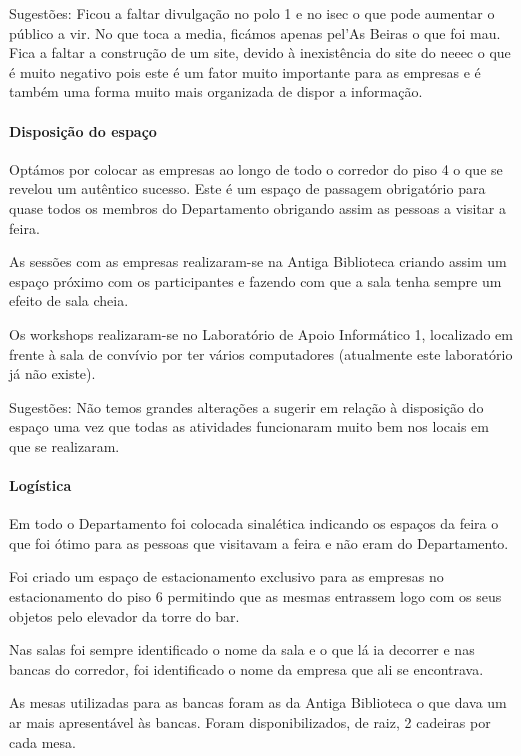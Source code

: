 Sugestões: Ficou a faltar divulgação no polo 1 e no \acrshort{isec} o que pode aumentar o público a vir. No que toca a media, ficámos apenas pel’As Beiras o que foi mau. Fica a faltar a construção de um site, devido à inexistência do site do \acrshort{neeec} o que é muito negativo pois este é um fator muito importante para as empresas e é também uma forma muito mais organizada de dispor a informação. 

\paragraph{Disposição do espaço}

Optámos por colocar as empresas ao longo de todo o corredor do piso 4 o que se revelou um autêntico sucesso. Este é um espaço de passagem obrigatório para quase todos os membros do Departamento obrigando assim as pessoas a visitar a feira. 

As sessões com as empresas realizaram-se na Antiga Biblioteca criando assim um espaço próximo com os participantes e fazendo com que a sala tenha sempre um efeito de sala cheia. 

Os workshops realizaram-se no Laboratório de Apoio Informático 1, localizado em frente à sala de convívio por ter vários computadores (atualmente este laboratório já não existe). 

Sugestões: Não temos grandes alterações a sugerir em relação à disposição do espaço uma vez que todas as atividades funcionaram muito bem nos locais em que se realizaram. 

\paragraph{Logística}

Em todo o Departamento foi colocada sinalética indicando os espaços da feira o que foi ótimo para as pessoas que visitavam a feira e não eram do Departamento. 

Foi criado um espaço de estacionamento exclusivo para as empresas no estacionamento do piso 6 permitindo que as mesmas entrassem logo com os seus objetos pelo elevador da torre do bar. 

Nas salas foi sempre identificado o nome da sala e o que lá ia decorrer e nas bancas do corredor, foi identificado o nome da empresa que ali se encontrava. 

As mesas utilizadas para as bancas foram as da Antiga Biblioteca o que dava um ar mais apresentável às bancas. Foram disponibilizados, de raiz, 2 cadeiras por cada mesa. 

